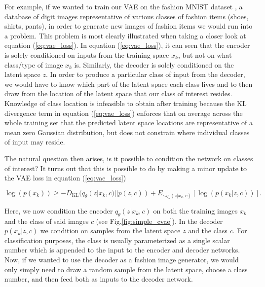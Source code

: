 For example, if we wanted to train our \ac{VAE} on 
the fashion MNIST dataset \cite{DBLP:journals/corr/abs-1708-07747}, 
a database of digit images representative of various classes 
of fashion items (shoes, shirts, pants), in order to 
generate new images of fashion items we would run into 
a problem. This problem is most clearly illustrated when 
taking a closer look at equation (\ref{eq:vae_loss}). In 
equation (\ref{eq:vae_loss}), it can seen that the encoder 
is solely conditioned on inputs from the training space 
$x_k$, but not on what class/type of image $x_k$ is. Similarly, 
the decoder is solely conditioned on the latent space $z$. In order 
to produce a particular class of input from the decoder, we would have 
to know which part of the latent space each class lives and to then 
draw from the location of the latent space that our class of 
interest resides. Knowledge of class location is infeasible to obtain 
after training because the KL 
divergence term in equation (\ref{eq:vae_loss}) enforces that 
on average across the whole training set that the predicted 
latent space locations are representative 
of a mean zero Gaussian distribution, but does not constrain where 
individual classes of input may reside.

The natural question then arises, is it possible to condition 
the network on classes of interest? It turns out that this is 
possible to do by making a minor update to the 
\ac{VAE} loss in equation (\ref{eq:vae_loss})

\begin{equation}
    \log(p(x_k)) \geq - D_{\textrm{KL}}(q_{\theta}(z|x_k,c) || p(z,c)) + 
    E_{\sim q_{\theta}(z|x_k,c)}[ \log({p(x_k|z,c)})].
\end{equation}

Here, we now condition the encoder $q_{\theta}(z|x_k,c)$ on both 
the training images $x_k$ and the class of said images $c$ (see Fig.\ref{fig:simple_cvae}). In the decoder 
$p(x_k|z,c)$ we condition on samples from the latent space $z$ and the 
class $c$. For classification purposes, the class is usually 
parameterized as a single scalar number which is appended to the input to 
the encoder and decoder networks. Now, if we wanted to use the decoder 
as a fashion image generator, we would only simply need to draw a 
random sample from the latent space, choose a class number, and then 
feed both as inputs to the decoder network. 

